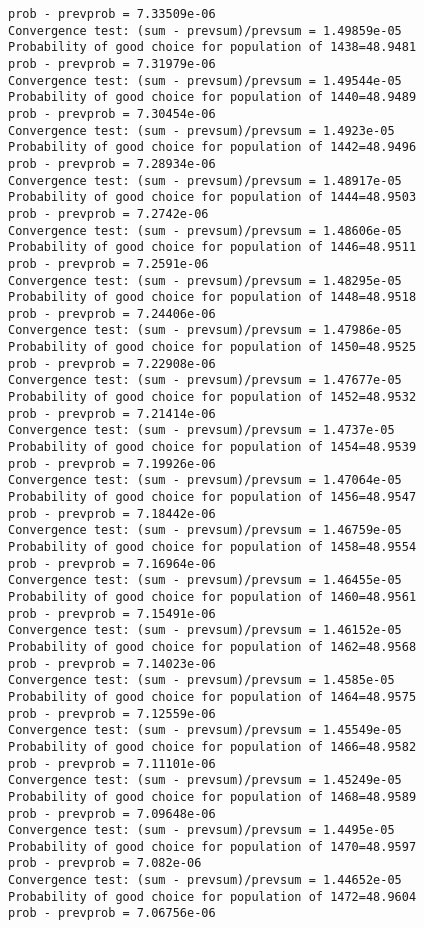 \documentclass[11pt,onecolumn]{article}
\begin{document}
\begin{verbatim}
prob - prevprob = 7.33509e-06
Convergence test: (sum - prevsum)/prevsum = 1.49859e-05
Probability of good choice for population of 1438=48.9481
prob - prevprob = 7.31979e-06
Convergence test: (sum - prevsum)/prevsum = 1.49544e-05
Probability of good choice for population of 1440=48.9489
prob - prevprob = 7.30454e-06
Convergence test: (sum - prevsum)/prevsum = 1.4923e-05
Probability of good choice for population of 1442=48.9496
prob - prevprob = 7.28934e-06
Convergence test: (sum - prevsum)/prevsum = 1.48917e-05
Probability of good choice for population of 1444=48.9503
prob - prevprob = 7.2742e-06
Convergence test: (sum - prevsum)/prevsum = 1.48606e-05
Probability of good choice for population of 1446=48.9511
prob - prevprob = 7.2591e-06
Convergence test: (sum - prevsum)/prevsum = 1.48295e-05
Probability of good choice for population of 1448=48.9518
prob - prevprob = 7.24406e-06
Convergence test: (sum - prevsum)/prevsum = 1.47986e-05
Probability of good choice for population of 1450=48.9525
prob - prevprob = 7.22908e-06
Convergence test: (sum - prevsum)/prevsum = 1.47677e-05
Probability of good choice for population of 1452=48.9532
prob - prevprob = 7.21414e-06
Convergence test: (sum - prevsum)/prevsum = 1.4737e-05
Probability of good choice for population of 1454=48.9539
prob - prevprob = 7.19926e-06
Convergence test: (sum - prevsum)/prevsum = 1.47064e-05
Probability of good choice for population of 1456=48.9547
prob - prevprob = 7.18442e-06
Convergence test: (sum - prevsum)/prevsum = 1.46759e-05
Probability of good choice for population of 1458=48.9554
prob - prevprob = 7.16964e-06
Convergence test: (sum - prevsum)/prevsum = 1.46455e-05
Probability of good choice for population of 1460=48.9561
prob - prevprob = 7.15491e-06
Convergence test: (sum - prevsum)/prevsum = 1.46152e-05
Probability of good choice for population of 1462=48.9568
prob - prevprob = 7.14023e-06
Convergence test: (sum - prevsum)/prevsum = 1.4585e-05
Probability of good choice for population of 1464=48.9575
prob - prevprob = 7.12559e-06
Convergence test: (sum - prevsum)/prevsum = 1.45549e-05
Probability of good choice for population of 1466=48.9582
prob - prevprob = 7.11101e-06
Convergence test: (sum - prevsum)/prevsum = 1.45249e-05
Probability of good choice for population of 1468=48.9589
prob - prevprob = 7.09648e-06
Convergence test: (sum - prevsum)/prevsum = 1.4495e-05
Probability of good choice for population of 1470=48.9597
prob - prevprob = 7.082e-06
Convergence test: (sum - prevsum)/prevsum = 1.44652e-05
Probability of good choice for population of 1472=48.9604
prob - prevprob = 7.06756e-06

\end{verbatim}
\end{document}
